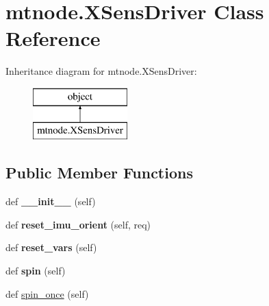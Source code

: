 \hypertarget{classmtnode_1_1XSensDriver}{}\section{mtnode.\+X\+Sens\+Driver Class Reference}
\label{classmtnode_1_1XSensDriver}
Inheritance diagram for mtnode.\+X\+Sens\+Driver\+:\begin{figure}[H]
\begin{center}
\leavevmode
\includegraphics[height=2.000000cm]{classmtnode_1_1XSensDriver}
\end{center}
\end{figure}
\subsection*{Public Member Functions}
\begin{DoxyCompactItemize}
\item 
\mbox{\label{classmtnode_1_1XSensDriver_a0b6ca7ea61c965acd29a65f637d365b8}} 
def {\bfseries \+\_\+\+\_\+init\+\_\+\+\_\+} (self)
\item 
\mbox{\label{classmtnode_1_1XSensDriver_a7d2ce3f2530723aa96defcc7792e6edd}} 
def {\bfseries reset\+\_\+imu\+\_\+orient} (self, req)
\item 
\mbox{\label{classmtnode_1_1XSensDriver_a863bd957f0d2b07c1a0eb811addc02dd}} 
def {\bfseries reset\+\_\+vars} (self)
\item 
\mbox{\label{classmtnode_1_1XSensDriver_aa5546c5d7da29fa865e266adb4ab3803}} 
def {\bfseries spin} (self)
\item 
def \hyperlink{classmtnode_1_1XSensDriver_aff28c45fee0b35e2d479cebb913ed3f1}{spin\+\_\+once} (self)
\end{DoxyCompactItemize}
